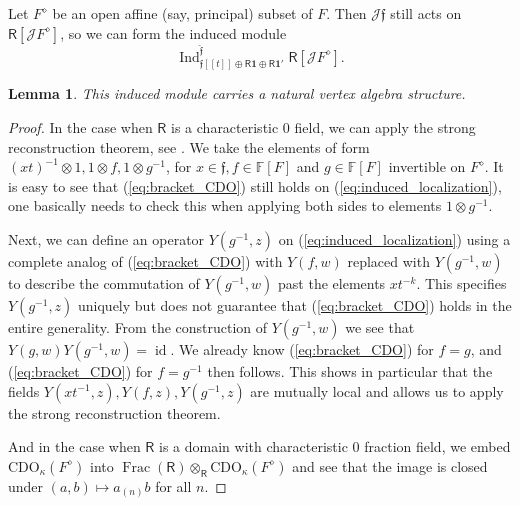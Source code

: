 \documentclass{amsart}
\newtheorem{Lem}[Thm]{Lemma}
\theoremstyle{definition}
\newcommand{\Ring}{\mathsf{R}}
\newcommand{\F}{\mathbb{F}}
\newcommand{\Jet}{\mathscr{J}}
\newcommand{\CDO}{\mathrm{CDO}}
\numberwithin{equation}{section}
\begin{document}
Let $F^\diamond$ be an open affine (say, principal) subset of $F$. Then $\Jet \mathfrak{f}$ still acts on $\Ring[\Jet F^\diamond]$, so we can form the induced module
\begin{equation}\label{eq:induced_localization}
\operatorname{Ind}_{\mathfrak{f}[[t]]\oplus \Ring\mathbf{1}\oplus \Ring\mathbf{1}'}^{\hat{\mathfrak{f}}}
\Ring[\Jet F^\diamond].
\end{equation}

\begin{Lem}\label{Lem:va_CDO_localization}
This induced module carries a natural vertex algebra structure. 
\end{Lem} 
\begin{proof}
In the case when $\Ring$ is a characteristic $0$ field, we can apply the strong reconstruction theorem, see \cite[Section 3.6]{BZF}. We take the elements of form $(xt)^{-1}\otimes 1, 1\otimes f, 1\otimes g^{-1}$, for $x\in \mathfrak{f}, f\in \F[F]$ and $g\in \F[F]$ invertible on $F^\diamond$. It is easy to see that (\ref{eq:bracket_CDO}) still holds on (\ref{eq:induced_localization}), one basically needs to check this when applying both sides to elements $1\otimes g^{-1}$.

Next, we can define an operator $Y(g^{-1},z)$ on 
(\ref{eq:induced_localization}) using a complete analog of (\ref{eq:bracket_CDO}) with $Y(f,w)$ replaced with $Y(g^{-1},w)$ to describe the commutation of $Y(g^{-1},w)$ past the elements $xt^{-k}$. This specifies $Y(g^{-1},z)$ uniquely but does not guarantee that (\ref{eq:bracket_CDO}) holds in the entire generality. From the construction of $Y(g^{-1},w)$ we see that 
$Y(g,w)Y(g^{-1},w)=\operatorname{id}$. We already know (\ref{eq:bracket_CDO}) for $f=g$, and (\ref{eq:bracket_CDO}) for $f=g^{-1}$ then follows. This shows in particular that the fields $Y(xt^{-1},z), Y(f,z), Y(g^{-1},z)$ are mutually local and allows us to apply the strong reconstruction theorem. 


And in the case when $\Ring$ is a domain with characteristic $0$ fraction field, we embed $\CDO_\kappa(F^\diamond)$ into $\operatorname{Frac}(\Ring)\otimes_{\Ring}\CDO_\kappa(F^\diamond)$ and see that the image is closed under $(a,b)\mapsto a_{(n)}b$ for all $n$.%
\end{proof}
\end{document}
